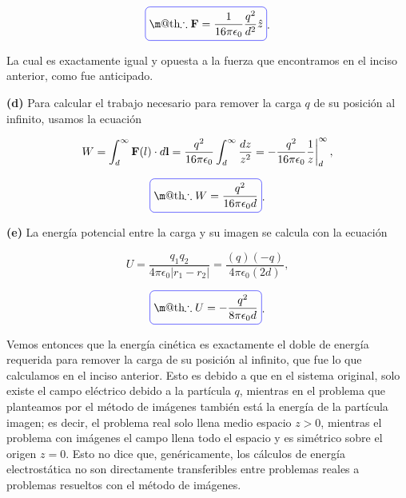 \documentclass[a4paper,10pt]{article}
\makeatletter
\numberwithin{equation}{section}
\newcommand{\zerodel}{.\kern-\nulldelimiterspace}
\newcommand*{\boxcolor}{blue}
\renewcommand{\boxed}[1]{\textcolor{\boxcolor}{%
\tikz[baseline={([yshift=-1ex]current bounding box.center)}] \node [rectangle, minimum width=1ex,rounded corners,draw] {\normalcolor\m@th$\displaystyle#1$};}}
\makeatother
\begin{document}
\begin{equation}
 \boxed{\therefore \mathbf{F} = \frac{1}{16\pi\epsilon_0}\frac{q^2}{d^2}\hat{z}}.
\end{equation}

La cual es exactamente igual y opuesta a la fuerza que encontramos en el inciso 
anterior, como fue anticipado.

\vspace{.3cm}

\textbf{(d)} Para calcular el trabajo necesario para remover la carga $q$ de su 
posición al infinito, usamos la ecuación 

\begin{equation}
 W = \int_d^\infty \mathbf{F}(l)\cdot d\mathbf{l} = \frac{q^2}{16\pi\epsilon_0}
 \int_d^\infty \frac{dz}{z^2} = \left\zerodel 
 - \frac{q^2}{16\pi\epsilon_0} \frac{1}{z}\right|_d^\infty,
\end{equation}

\begin{equation}
 \boxed{\therefore W = \frac{q^2}{16\pi\epsilon_0d}}.
\end{equation}

\textbf{(e)} La energía potencial entre la carga y su imagen se calcula 
con la ecuación 

\begin{equation}
 U = \frac{q_1q_2}{4\pi\epsilon_0|r_1 - r_2|} = \frac{(q)(-q)}{4\pi\epsilon_0(2d)},
\end{equation}

\begin{equation}
 \boxed{\therefore U = - \frac{q^2}{8\pi\epsilon_0d}}.
\end{equation}

Vemos entonces que la energía cinética es exactamente el doble de energía requerida 
para remover la carga de su posición al infinito, que fue lo que calculamos en el 
inciso anterior. Esto es debido a que en el sistema original, solo existe el 
campo eléctrico debido a la partícula $q$, mientras en el problema que planteamos 
por el método de imágenes también está la energía de la partícula imagen; es decir, 
el problema real solo llena medio espacio $z>0$, mientras el problema con imágenes 
el campo llena todo el espacio y es simétrico sobre el origen $z=0$. Esto no dice que, 
genéricamente, los cálculos de energía electrostática no son directamente transferibles 
entre problemas reales a problemas resueltos con el método de imágenes.

\vspace{.3cm}
\end{document}

